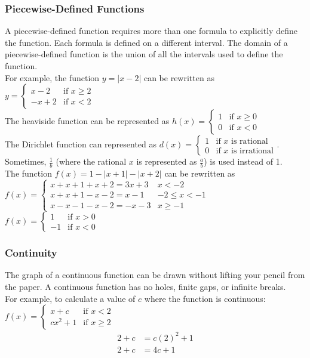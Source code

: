 \documentclass{article}
\begin{document}
	\subsubsection{Piecewise-Defined Functions}
	A piecewise-defined function requires more than one formula to explicitly define the function. Each formula is defined on a different interval. The domain of a piecewise-defined function is the union of all the intervals used to define the function.\\
	For example, the function $y=|x-2|$ can be rewritten as $y=\begin{cases}
		x-2&\text{if }x\geq2\\
		-x+2&\text{if }x<2
	\end{cases}$\\
	The heaviside function can be represented as $h(x)=\begin{cases}
		1&\text{if }x\geq0\\
		0&\text{if }x<0
	\end{cases}$\\
	The Dirichlet function can represented as $d(x)=\begin{cases}
		1&\text{if }x\text{ is rational}\\
		0&\text{if }x\text{ is irrational}
	\end{cases}$. Sometimes, $\frac{1}{b}$ (where the rational $x$ is represented as $\frac{a}{b}$) is used instead of 1.\\
	The function $f(x)=1-|x+1|-|x+2|$ can be rewritten as $f(x)=\begin{cases}
		x+x+1+x+2=3x+3&x<-2\\x+x+1-x-2=x-1&-2\leq x<-1\\x-x-1-x-2=-x-3&x\geq-1
	\end{cases}$\\
	$f(x)=\begin{cases}
		1&\text{if }x>0\\
		-1&\text{if }x<0
	\end{cases}$
	
	\subsubsection{Continuity}
	The graph of a continuous function can be drawn without lifting your pencil from the paper. A continuous function has no holes, finite gaps, or infinite breaks.\\
	For example, to calculate a value of $c$ where the function is continuous: $f(x)=\begin{cases}
		x+c&\text{if }x<2\\
		cx^2+1&\text{if }x\geq2
	\end{cases}$
	\begin{align}
		2+c&=c(2)^2+1\\
		2+c&=4c+1\\
	\end{align}
\end{document}
